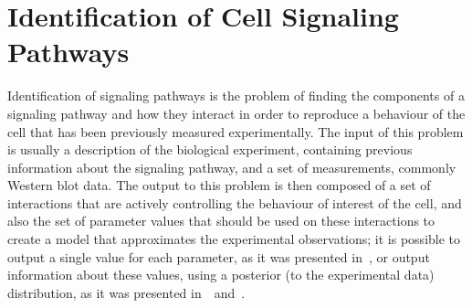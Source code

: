 \section{Identification of Cell Signaling Pathways}
Identification of signaling pathways is the problem of finding the 
components of a signaling pathway and how they interact in order to
reproduce a behaviour of the cell that has been previously measured 
experimentally. The input of this problem is usually a description of 
the biological experiment, containing previous information about the 
signaling pathway, and a set of measurements, commonly Western blot 
data. The output to this problem is then composed of a set of 
interactions that are actively controlling the behaviour of interest of 
the cell, and also the set of parameter values that should be used on 
these interactions to create a model that approximates the experimental 
observations; it is possible to output a single value for each 
parameter, as it was presented in~\cite{Wu15}, or output information 
about these values, using a posterior (to the experimental data) 
distribution, as it was presented in~\cite{Liepe2014}~and~\cite{Xura20}.

